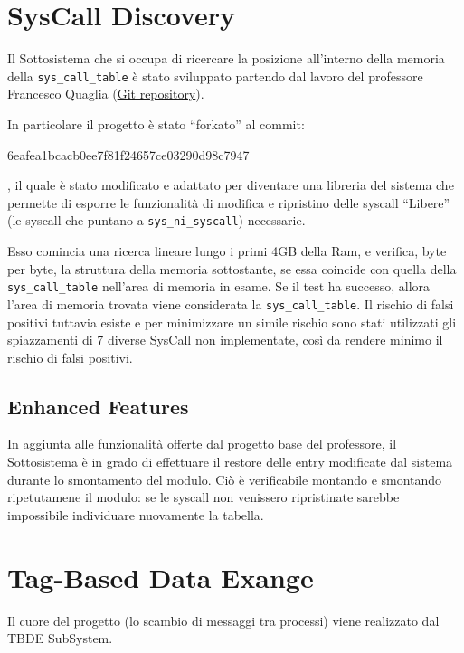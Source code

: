 \section{SysCall Discovery} \label{SysCallDiscovery}

Il Sottosistema che si occupa di ricercare la posizione all'interno della memoria della \verb|sys_call_table| è stato
sviluppato partendo dal lavoro del professore Francesco Quaglia
(\href{https://github.com/FrancescoQuaglia/Linux-sys_call_table-discoverer}{Git repository}).

In particolare il progetto è stato ``forkato'' al commit:
\begin{verb}6eafea1bcacb0ee7f81f24657ce03290d98c7947\end{verb}, il quale è stato modificato e
adattato per diventare una libreria del sistema che permette di esporre le funzionalità di modifica e ripristino
delle syscall ``Libere'' (le syscall che puntano a \verb|sys_ni_syscall|) necessarie.

Esso comincia una ricerca lineare lungo i primi 4GB della Ram, e verifica, byte per byte, la struttura della memoria
sottostante, se essa coincide con quella della \verb|sys_call_table| nell'area di memoria in esame.
Se il test ha successo, allora l'area di memoria trovata viene considerata la \verb|sys_call_table|.
Il rischio di falsi positivi tuttavia esiste e per minimizzare un simile rischio sono stati utilizzati gli
spiazzamenti di 7 diverse SysCall non implementate, così da rendere minimo il rischio di falsi positivi.

\subsection{Enhanced Features} \label{SysCallDiscovery_EnhancedFeatures}
In aggiunta alle funzionalità offerte dal progetto base del professore, il Sottosistema è in grado di effettuare il
restore delle entry modificate dal sistema durante lo smontamento del modulo.
Ciò è verificabile montando e smontando ripetutamene il modulo: se le syscall non venissero ripristinate sarebbe
impossibile individuare nuovamente la tabella.
\newpage


\section{Tag-Based Data Exange} \label{tbde}

Il cuore del progetto (lo scambio di messaggi tra processi) viene realizzato dal TBDE SubSystem.

